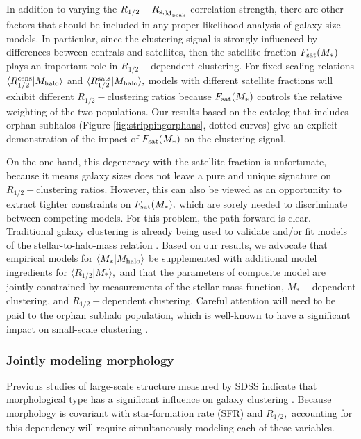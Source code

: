 \documentclass[usenatbib,usegraphicx,letterpaper]{mn2e}
\newcommand{\rhalf}{R_{1/2}}
\newcommand{\mstar}{M_{\ast}}
\newcommand{\mhalo}{M_{\rm halo}}
\newcommand{\rspeak}{{R_{\rm s,}}_{\rm M_{peak}}}
\begin{document}
In addition to varying the $\rhalf-\rspeak$ correlation strength, there are other factors that should be included in any proper likelihood analysis of galaxy size models. In particular, since the clustering signal is strongly influenced by differences between centrals and satellites, then the satellite fraction $F_{\rm sat}(\mstar)$ plays an important role in $\rhalf-$dependent clustering. For fixed scaling relations $\langle\rhalf^{\rm cens}\vert\mhalo\rangle$ and $\langle\rhalf^{\rm sats}\vert\mhalo\rangle,$ models with different satellite fractions will exhibit different $\rhalf-$clustering ratios because $F_{\rm sat}(\mstar)$ controls the relative weighting of the two populations. Our results based on the catalog that includes orphan subhalos (Figure \ref{fig:strippingorphans}, dotted curves) give an explicit demonstration of the impact of $F_{\rm sat}(\mstar)$ on the clustering signal. 

On the one hand, this degeneracy with the satellite fraction is unfortunate, because it means galaxy sizes does not leave a pure and unique signature on $\rhalf-$clustering ratios. However, this can also be viewed as an opportunity to extract tighter constraints on $F_{\rm sat}(\mstar),$ which are sorely needed to discriminate between competing models. For this problem, the path forward is clear. Traditional galaxy clustering is already being used to validate and/or fit models of the stellar-to-halo-mass relation \citep[e.g.,][]{moster_etal13,behroozi13_smhm,lehmann_etal15}. Based on our results, we advocate that empirical models for $\langle\mstar\vert\mhalo\rangle$ be supplemented with additional model ingredients for $\langle\rhalf\vert\mstar\rangle,$ and that the parameters of composite model are jointly constrained by measurements of the stellar mass function, $\mstar-$dependent clustering, and $\rhalf-$dependent clustering. Careful attention will need to be paid to the orphan subhalo population, which is well-known to have a significant impact on small-scale clustering \citep{guo_white13,campbell_etal17}. 

\subsubsection{Jointly modeling morphology}

Previous studies of large-scale structure measured by SDSS indicate that morphological type has a significant influence on galaxy clustering \citep{skibba_etal08}. Because morphology is covariant with star-formation rate (SFR) and $\rhalf,$ accounting for this dependency will require simultaneously modeling each of these variables. 
\end{document}
